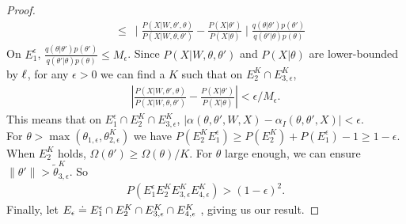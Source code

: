 \begin{proof}
\begin{align*}
& \leq \ \mid \frac{P(X | W, \theta' , \theta)}{P(X | W, \theta , \theta')} - \frac{P(X | \theta')}{P(X | \theta)}\mid  \frac{q(\theta | \theta')p(\theta')}{q(\theta' | \theta)p(\theta)}
\end{align*}
%
On $E^\epsilon_1$, $\frac{q(\theta | \theta')p(\theta')}{q(\theta' | \theta)p(\theta)} \le M_\epsilon$.
Since ${P(X | W, \theta , \theta')}$ and ${P(X | \theta)}$
are lower-bounded by $\ell$, for any $\epsilon > 0$ we can 
find a $K$ such that on $E^K_2 \cap E^K_{3,\epsilon}$,
\begin{align*}
|\frac{P(X | W, \theta' , \theta)}{P(X | W, \theta , \theta')} - 
   \frac{P(X | \theta')}{P(X | \theta)}| < \epsilon / M_\epsilon.
\end{align*}
This means that on $E^\epsilon_1 \cap E_2^K \cap E^K_{3,\epsilon}$,
$|\alpha(\theta, \theta', W, X) - \alpha_I(\theta, \theta', X)| < \epsilon$.\\
For $\theta > \max (\theta_{1,\epsilon},\theta^K_{2,\epsilon})$ 
we have 
$
P(E^K_2 E^\epsilon_1) \ge P(E^K_2) + P(E_1^\epsilon) - 1 \ge 1 - \epsilon.
$\\
When $E^K_2$ holds, $\Omega(\theta') \ge \Omega(\theta)/K$.
For $\theta$ large enough, we can ensure $ \| \theta' \| > \tilde{\theta}^K_{3,\epsilon}$.
So \begin{align*}
P(E_1^\epsilon E_2^K E_{3,\epsilon}^K E_{4,\epsilon}^K) > (1- \epsilon)^2.
\end{align*} 
Finally, let $E_\epsilon \doteq E_1^\epsilon \cap E_2^K \cap E_{3,\epsilon}^K \cap E_{4,\epsilon}^K$ , giving us our result.


\end{proof}

